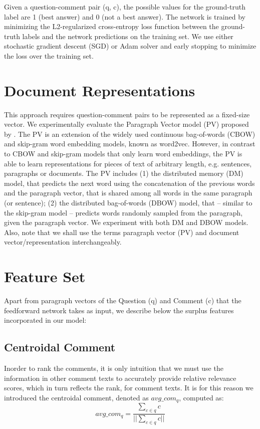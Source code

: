 \documentclass[12pt, a4paper, oneside]{Thesis} %
\begin{document}
Given a question-comment pair (q, c), the possible values for the ground-truth label are 1 (best answer) and 0 (not a best answer). The network is trained by minimizing the L2-regularized cross-entropy loss function between the ground-truth labels and the network predictions on the training set. We use either stochastic gradient descent (SGD) or Adam solver and early stopping to minimize the loss over the training set.

\section{Document Representations}

This approach requires question-comment pairs to be represented as a fixed-size vector. We experimentally evaluate the Paragraph Vector model (PV) proposed by \cite{le2014distributed}. The PV is an extension of the widely used continuous bag-of-words (CBOW) and skip-gram word embedding models, known as word2vec. However, in contrast to CBOW and skip-gram models that only learn word embeddings, the PV is able to learn representations for pieces of text of arbitrary length, e.g. sentences, paragraphs or documents. The PV includes (1) the distributed memory (DM) model, that predicts the next word using the concatenation of the previous words and the paragraph vector, that is shared among all words in the same paragraph (or sentence); (2) the distributed bag-of-words (DBOW) model, that – similar to the skip-gram model – predicts words randomly sampled from the paragraph, given the paragraph vector. We experiment with both DM and DBOW models. Also, note that we shall use the terms paragraph vector (PV) and document vector/representation interchangeably.

\section{Feature Set}
\label{subsection:feature-set}

Apart from paragraph vectors of the Question (q) and Comment (c) that the feedforward network takes as input, we describe below the surplus features incorporated in our model:

\subsection{Centroidal Comment}
\label{subsection:centroidal-comment}

Inorder to rank the comments, it is only intuition that we must use the information in other comment texts to accurately provide relative relevance scores, which in turn reflects the rank, for comment texts. It is for this reason we introduced the centroidal comment, denoted as $avg\_com_q$, computed as:
\[ avg\_com_q = \frac{\sum\limits_{c \in q} c}{||\sum\limits_{c \in q} c||} \tag{1} \label{equation:1} \]
\end{document}
